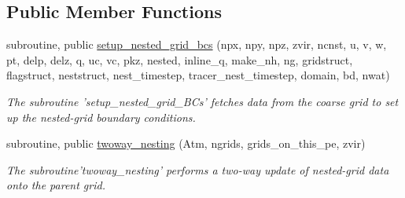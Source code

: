 \subsection*{Public Member Functions}
\begin{DoxyCompactItemize}
\item 
subroutine, public \hyperlink{classfv__nesting__mod_ab215fbbbf962fbfa6ed72b7d6bfb3cd8}{setup\-\_\-nested\-\_\-grid\-\_\-bcs} (npx, npy, npz, zvir, ncnst, u, v, w, pt, delp, delz, q, uc, vc, pkz, nested, inline\-\_\-q, make\-\_\-nh, ng, gridstruct, flagstruct, neststruct, nest\-\_\-timestep, tracer\-\_\-nest\-\_\-timestep, domain, bd, nwat)
\begin{DoxyCompactList}\small\item\em The subroutine 'setup\-\_\-nested\-\_\-grid\-\_\-\-B\-Cs' fetches data from the coarse grid to set up the nested-\/grid boundary conditions. \end{DoxyCompactList}\item 
subroutine, public \hyperlink{classfv__nesting__mod_afedcc378d1c25e2b9d58ea796dc10b9b}{twoway\-\_\-nesting} (Atm, ngrids, grids\-\_\-on\-\_\-this\-\_\-pe, zvir)
\begin{DoxyCompactList}\small\item\em The subroutine'twoway\-\_\-nesting' performs a two-\/way update of nested-\/grid data onto the parent grid. \end{DoxyCompactList}\end{DoxyCompactItemize}
